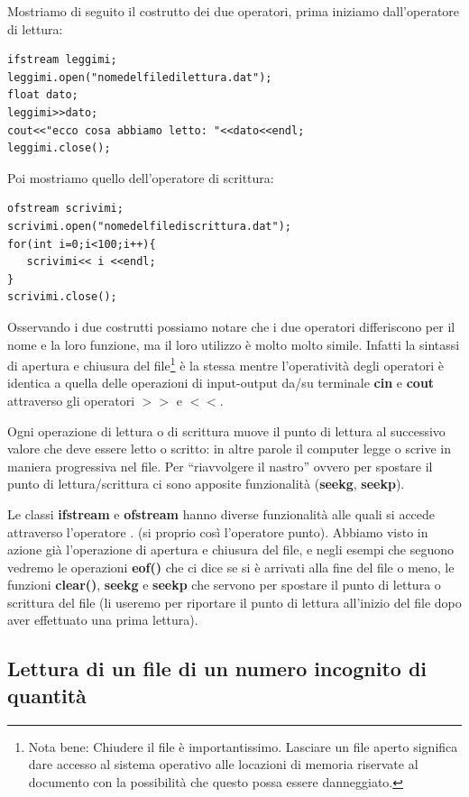 \documentclass[11pt,fleqn]{book} %
\begin{document}
Mostriamo di seguito il costrutto dei due operatori, prima iniziamo dall'operatore di lettura:

\begin{verbatim}
ifstream leggimi;
leggimi.open("nomedelfiledilettura.dat"); 
float dato;
leggimi>>dato;
cout<<"ecco cosa abbiamo letto: "<<dato<<endl;
leggimi.close();
\end{verbatim} 

Poi mostriamo quello dell'operatore di scrittura:


\begin{verbatim}
ofstream scrivimi;
scrivimi.open("nomedelfilediscrittura.dat"); 
for(int i=0;i<100;i++){
   scrivimi<< i <<endl;
}
scrivimi.close();
\end{verbatim}

Osservando i due costrutti possiamo notare che i due operatori differiscono per il nome e la loro funzione, ma il loro utilizzo è molto molto simile. Infatti la sintassi di apertura e chiusura del file\footnote{Nota bene: Chiudere il file è importantissimo. Lasciare un file aperto significa dare accesso al sistema operativo alle locazioni di memoria riservate al documento con la possibilità che questo possa essere danneggiato.} è la stessa mentre l'operatività degli operatori è identica a quella delle operazioni di input-output da/su terminale \textbf{cin} e \textbf{cout} attraverso gli operatori $>>$ e $<<$.


Ogni operazione di lettura o di scrittura muove il punto di lettura al successivo valore che deve essere letto o scritto: in altre parole il computer legge o scrive in maniera progressiva nel file. Per ``riavvolgere il nastro'' ovvero per spostare il punto di lettura/scrittura ci sono apposite funzionalità (\textbf{seekg}, \textbf{seekp}). 

Le classi \textbf{ifstream} e \textbf{ofstream} hanno diverse funzionalità alle quali si accede attraverso l'operatore . (si proprio così l'operatore punto). Abbiamo visto in azione già l'operazione di apertura e chiusura del file, e negli esempi che seguono vedremo le operazioni \textbf{eof()} che ci dice se si è arrivati alla fine del file o meno, le funzioni \textbf{clear()}, \textbf{seekg} e \textbf{seekp} che servono per spostare il punto di lettura o scrittura del file (li useremo per riportare il punto di lettura all'inizio del file dopo aver effettuato una prima lettura).

\subsection{Lettura di un file di un numero incognito di quantità}
\end{document}
